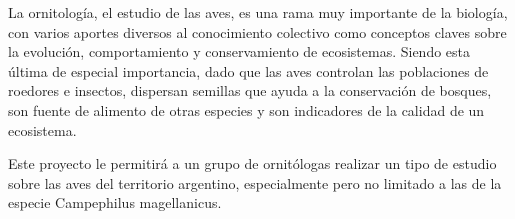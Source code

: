 La ornitología, el estudio de las aves, es una rama muy importante de la biología, con varios aportes diversos al conocimiento colectivo como conceptos claves sobre la evolución, comportamiento y conservamiento de ecosistemas. Siendo esta última de especial importancia, dado que las aves controlan las poblaciones de roedores e insectos, dispersan semillas que ayuda a la conservación de bosques, son fuente de alimento de otras especies y son indicadores de la calidad de un ecosistema.

Este proyecto le permitirá a un grupo de ornitólogas  realizar un tipo de estudio  sobre las aves del territorio argentino, especialmente pero no limitado a las de la especie Campephilus magellanicus.